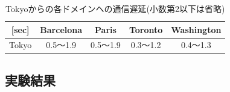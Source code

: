 \documentclass[a4paper,12pt]{jsarticle}
\begin{document}
\begin{table}[tb]
  \centering
  \caption{Tokyoからの各ドメインへの通信遅延(小数第2以下は省略)}
  \label{Byte}
  \begin{tabular}{c|c|c|c|c|}
  \cline{2-5}
  [sec]                       & Barcelona &    Paris   &   Toronto  & Washington \\ \hline
  \multicolumn{1}{|c|}{Tokyo} &  0.5〜1.9 &  0.5〜1.9  &  0.3〜1.2  &  0.4〜1.3  \\ \hline
  \end{tabular}
\end{table}

\subsection{実験結果}
\end{document}
